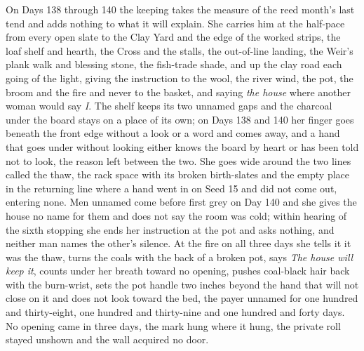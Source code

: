 \documentclass{design/chronicle}
\begin{document}
{On Days 138 through 140 the keeping takes the measure of the reed month’s last tend and adds nothing to what it will explain. She carries him at the half-pace from every open slate to the Clay Yard and the edge of the worked strips, the loaf shelf and hearth, the Cross and the stalls, the out-of-line landing, the Weir’s plank walk and blessing stone, the fish-trade shade, and up the clay road each going of the light, giving the instruction to the wool, the river wind, the pot, the broom and the fire and never to the basket, and saying \emph{the house} where another woman would say \emph{I}. The shelf keeps its two unnamed gaps and the charcoal under the board stays on a place of its own; on Days 138 and 140 her finger goes beneath the front edge without a look or a word and comes away, and a hand that goes under without looking either knows the board by heart or has been told not to look, the reason left between the two. She goes wide around the two lines called the thaw, the rack space with its broken birth-slates and the empty place in the returning line where a hand went in on Seed 15 and did not come out, entering none. Men unnamed come before first grey on Day 140 and she gives the house no name for them and does not say the room was cold; within hearing of the sixth stopping she ends her instruction at the pot and asks nothing, and neither man names the other’s silence. At the fire on all three days she tells it it was the thaw, turns the coals with the back of a broken pot, says \emph{The house will keep it}, counts under her breath toward no opening, pushes coal-black hair back with the burn-wrist, sets the pot handle two inches beyond the hand that will not close on it and does not look toward the bed, the payer unnamed for one hundred and thirty-eight, one hundred and thirty-nine and one hundred and forty days. No opening came in three days, the mark hung where it hung, the private roll stayed unshown and the wall acquired no door.

}
\end{document}
